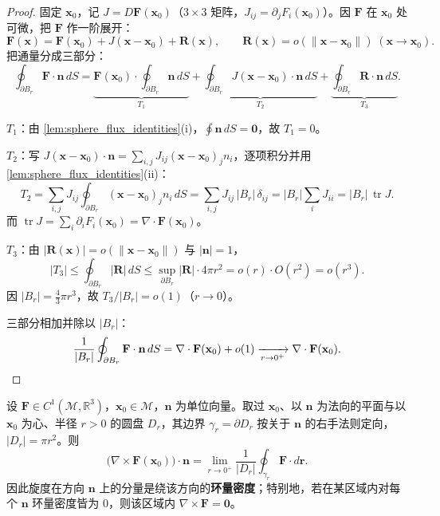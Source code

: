 \begin{proof}
固定 $\mathbf{x}_0$，记 $J = D\mathbf F(\mathbf x_0)$（$3\times3$ 矩阵，$J_{ij} = \partial_j F_i(\mathbf x_0)$）。因 $\mathbf F$ 在 $\mathbf x_0$ 处可微，把 $\mathbf F$ 作一阶展开：
\[
\mathbf F(\mathbf x) = \mathbf F(\mathbf x_0) + J(\mathbf x-\mathbf x_0) + \mathbf R(\mathbf x),
\qquad \mathbf R(\mathbf x) = o(\|\mathbf x-\mathbf x_0\|)\;(\mathbf x\to\mathbf x_0).
\]
把通量分成三部分：
\[
\oint_{\partial B_r}\mathbf F\cdot\mathbf n\,dS
= \underbrace{\mathbf F(\mathbf x_0)\cdot\oint_{\partial B_r}\mathbf n\,dS}_{T_1}
+ \underbrace{\oint_{\partial B_r} J(\mathbf x-\mathbf x_0)\cdot\mathbf n\,dS}_{T_2}
+ \underbrace{\oint_{\partial B_r}\mathbf R\cdot\mathbf n\,dS}_{T_3}.
\]

\textbf{$T_1$}：由 \cref{lem:sphere_flux_identities}(i)，$\oint \mathbf n\,dS = \mathbf 0$，故 $T_1=0$。

\textbf{$T_2$}：写 $J(\mathbf x-\mathbf x_0)\cdot\mathbf n = \sum_{i,j} J_{ij}(\mathbf x-\mathbf x_0)_j n_i$，逐项积分并用 \cref{lem:sphere_flux_identities}(ii)：
\[
T_2 = \sum_{i,j} J_{ij}\oint_{\partial B_r}(\mathbf x-\mathbf x_0)_j n_i\,dS
= \sum_{i,j} J_{ij}\,|B_r|\,\delta_{ij}
= |B_r|\sum_{i} J_{ii}
= |B_r|\,\operatorname{tr}J .
\]
而 $\operatorname{tr}J = \sum_i \partial_i F_i(\mathbf x_0) = \nabla\cdot\mathbf F(\mathbf x_0)$。

\textbf{$T_3$}：由 $|\mathbf R(\mathbf x)| = o(\|\mathbf x-\mathbf x_0\|)$ 与 $|\mathbf n|=1$，
\[
|T_3| \le \oint_{\partial B_r}|\mathbf R|\,dS \le \sup_{\partial B_r}|\mathbf R| \cdot 4\pi r^2 = o(r)\cdot O(r^2)= o(r^3).
\]
因 $|B_r| = \tfrac43\pi r^3$，故 $T_3/|B_r| = o(1)$（$r\to0$）。

三部分相加并除以 $|B_r|$：
\[
\frac{1}{|B_r|}\oint_{\partial B_r}\mathbf F\cdot\mathbf n\,dS
= \nabla\cdot\mathbf F(\mathbf x_0) + o(1) \xrightarrow[r\to0^+]{}\nabla\cdot\mathbf F(\mathbf x_0). \qedhere
\]
\end{proof}

\begin{proposition}[旋度是环量密度]\label{prop:curl_circulation_density}
设 $\mathbf{F} \in C^1(\mathcal{M}, \mathbb{R}^3)$，$\mathbf{x}_0 \in \mathcal{M}$，$\mathbf n$ 为单位向量。取过 $\mathbf x_0$、以 $\mathbf n$ 为法向的平面与以 $\mathbf x_0$ 为心、半径 $r>0$ 的圆盘 $D_r$，其边界 $\gamma_r = \partial D_r$ 按关于 $\mathbf n$ 的右手法则定向，$|D_r| = \pi r^2$。则
\[
\bigl(\nabla \times \mathbf{F}(\mathbf{x}_0)\bigr)\cdot\mathbf{n}
= \lim_{r \to 0^{+}} \frac{1}{|D_r|}\oint_{\gamma_r} \mathbf{F} \cdot d\mathbf{r} .
\]
因此旋度在方向 $\mathbf n$ 上的分量是绕该方向的\textbf{环量密度}；特别地，若在某区域内对每个 $\mathbf n$ 环量密度皆为 $0$，则该区域内 $\nabla\times\mathbf F=\mathbf 0$。
\end{proposition}

